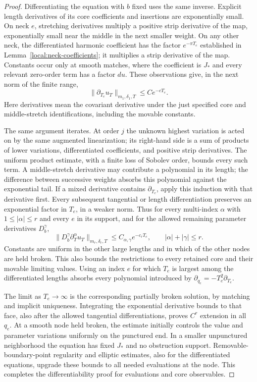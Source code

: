 \documentclass[11pt]{article}
\theoremstyle{definition}
\theoremstyle{remark}
\numberwithin{equation}{section}
\begin{document}
\begin{proof}
Differentiating the equation with
$b$ fixed uses the same inverse.  Explicit length derivatives of its
core coefficients and insertions are exponentially small.  On neck
$e$, stretching derivatives multiply a positive strip derivative of
the map, exponentially small near the middle in the next smaller
weight.  On any other neck, the differentiated harmonic coefficient
has the factor $e^{-\pi T_e}$ established in
Lemma~\ref{local:neck-coefficients}; it multiplies a strip derivative
of the map.  Constants occur only at smooth matches, where the
coefficient is $J_*$ and every relevant zero-order term has a factor
$du$.  These observations give, in the next norm of the finite range,
\[
 \|\partial_{T_e}u_T\|_{m_1,\delta_1,T}
           \leq C e^{-cT_e}.
\]
Here derivatives mean the covariant derivative under the just
specified core and middle-stretch identifications, including the
movable constants.

The same argument iterates.  At order $j$ the unknown highest
variation is acted on by the same augmented linearization; its
right-hand side is a sum of products of lower variations, differentiated
coefficients, and positive strip derivatives.  The uniform product
estimate, with a finite loss of Sobolev order, bounds every such term.
A middle-stretch derivative may contribute a polynomial in its length;
the difference between successive weights absorbs this polynomial
against the exponential tail.  If a mixed derivative contains
$\partial_{T_e}$, apply this induction with that derivative first.
Every subsequent tangential or length differentiation preserves an
exponential factor in $T_e$, in a weaker norm.  Thus for every
multi-index $\alpha$ with $1\leq|\alpha|\leq r$ and every $e$ in its
support, and for the allowed remaining parameter derivatives $D_b^\gamma$,
\begin{equation}\label{local:length-derivatives}
 \|D_b^\gamma\partial_T^\alpha u_T\|_{m_r,\delta_r,T}
              \leq C_{\alpha,\gamma}e^{-c_rT_e},
 \qquad |\alpha|+|\gamma|\leq r.
\end{equation}
Constants are uniform in the other large lengths and in which of
the other nodes are held broken.  This also bounds the restrictions
to every retained core and their movable limiting values.  Using
an index $e$ for which $T_e$ is largest among the differentiated
lengths absorbs every polynomial introduced by
$\partial_{q_e}=-T_e^2\partial_{T_e}$.

The limit as $T_e\to\infty$ is the corresponding partially broken
solution, by matching and implicit uniqueness.  Integrating the
exponential derivative bounds to that face, also after the allowed
tangential differentiations, proves $C^r$ extension in all $q_e$.
At a smooth node held broken, the estimate initially controls the
value and parameter variations uniformly on the punctured end.
In a smaller unpunctured neighborhood the equation has fixed $J_*$
and no obstruction support.  Removable-boundary-point regularity and
elliptic estimates, also for the differentiated equations, upgrade
these bounds to all needed evaluations at the node.  This completes
the differentiability proof for evaluations and core observables.


\end{proof}
\end{document}
